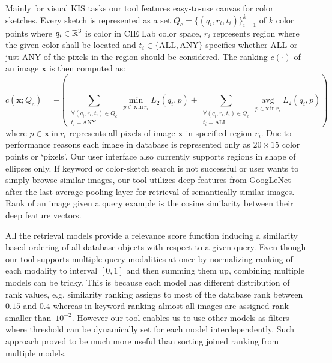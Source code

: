 Mainly for visual KIS tasks our tool features easy-to-use canvas for color sketches. Every sketch is represented as a set $Q_c = \{\left(q_i, r_i, t_i\right)\}^k_{i=1}$ of $k$ color points where $q_i\in\mathbb{R}^3$ is color in CIE Lab color space, $r_i$ represents region where the given color shall be located and $t_i\in \{\mathrm{ALL},\mathrm{ANY}\}$ specifies whether ALL or just ANY of the pixels in the region should be considered. The ranking $c(\cdot)$ of an image $\bm{x}$ is then computed as:
\begin{equation}
c\left(\bm{x}; Q_c\right) =-\left(\sum\limits_{\substack{\forall \left(q_i,r_i,t_i\right) \in Q_c\\t_i=\mathrm{ANY}}} \min\limits_{p\in\bm{x}\,\mathrm{in}\,r_i}L_2\left(q_i, p\right)+\sum\limits_{\substack{\forall \left(q_i,r_i,t_i\right) \in Q_c\\t_i=\mathrm{ALL}}} \mathop{\mathrm{avg}}\limits_{p\in\bm{x}\,\mathrm{in}\,r_i}L_2\left(q_i, p\right)\right)
\end{equation}
where $p\in\bm{x}\ \mathrm{in}\ r_i$ represents all pixels of image $\bm{x}$ in specified region $r_i$. Due to performance reasons each image in database is represented only as $20\times 15$ color points or `pixels'. Our user interface also currently supports regions in shape of ellipses only. If keyword or color-sketch search is not successful or user wants to simply browse similar images, our tool utilizes deep features from GoogLeNet~\cite{szegedy2015going} after the last average pooling layer for retrieval of semantically similar images. Rank of an image given a query example is the cosine similarity between their deep feature vectors.


All the retrieval models provide a relevance score function inducing a similarity based ordering of all database objects with respect to a given query. Even though our tool supports multiple query modalities at once by normalizing ranking of each modality to interval $[0, 1]$ and then summing them up, combining multiple models can be tricky. This is because each model has different distribution of rank values, e.g. similarity ranking assigns to most of the database rank between $0.15$ and $0.4$ whereas in keyword ranking almost all images are assigned rank smaller than~$10^{-2}$. However our tool enables us to use other models as filters where threshold can be dynamically set for each model interdependently. Such approach proved to be much more useful than sorting joined ranking from multiple models.

